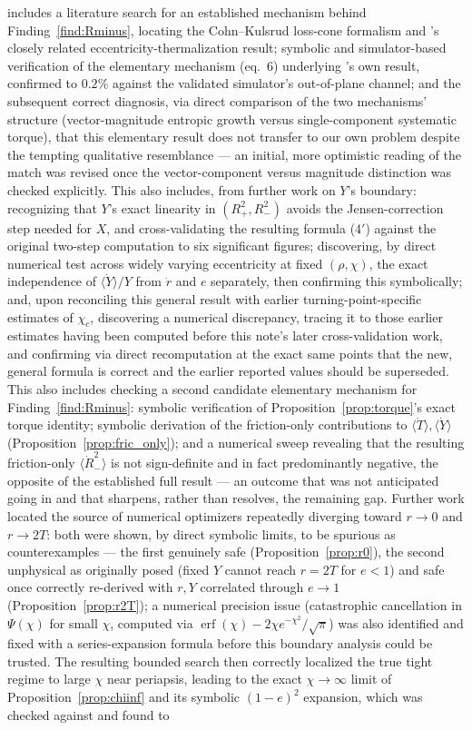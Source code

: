 \documentclass[12pt]{amsart}
\theoremstyle{plain}
\theoremstyle{remark}
\begin{document}
includes a literature search for an established mechanism behind Finding~\ref{find:Rminus}, locating the Cohn--Kulsrud loss-cone formalism and \cite{HamiltonModak2024}'s closely related eccentricity-thermalization result; symbolic and simulator-based verification of the elementary mechanism (eq.~6) underlying \cite{HamiltonModak2024}'s own result, confirmed to $0.2\%$ against the validated simulator's out-of-plane channel; and the subsequent correct diagnosis, via direct comparison of the two mechanisms' structure (vector-magnitude entropic growth versus single-component systematic torque), that this elementary result does not transfer to our own problem despite the tempting qualitative resemblance --- an initial, more optimistic reading of the match was revised once the vector-component versus magnitude distinction was checked explicitly. This also includes, from further work on $Y$'s boundary: recognizing that $Y$'s exact linearity in $(R_+^2,R_-^2)$ avoids the Jensen-correction step needed for $X$, and cross-validating the resulting formula (4$'$) against the original two-step computation to six significant figures; discovering, by direct numerical test across widely varying eccentricity at fixed $(\rho,\chi)$, the exact independence of $\langle\dot Y\rangle/Y$ from $\dot r$ and $e$ separately, then confirming this symbolically; and, upon reconciling this general result with earlier turning-point-specific estimates of $\chi_c$, discovering a numerical discrepancy, tracing it to those earlier estimates having been computed before this note's later cross-validation work, and confirming via direct recomputation at the exact same points that the new, general formula is correct and the earlier reported values should be superseded. This also includes checking a second candidate elementary mechanism for Finding~\ref{find:Rminus}: symbolic verification of Proposition~\ref{prop:torque}'s exact torque identity; symbolic derivation of the friction-only contributions to $\langle\dot T\rangle,\langle\dot Y\rangle$ (Proposition~\ref{prop:fric_only}); and a numerical sweep revealing that the resulting friction-only $\langle\dot R_-^2\rangle$ is not sign-definite and in fact predominantly negative, the opposite of the established full result --- an outcome that was not anticipated going in and that sharpens, rather than resolves, the remaining gap. Further work located the source of numerical optimizers repeatedly diverging toward $r\to0$ and $r\to2T$: both were shown, by direct symbolic limits, to be spurious as counterexamples --- the first genuinely safe (Proposition~\ref{prop:r0}), the second unphysical as originally posed (fixed $Y$ cannot reach $r=2T$ for $e<1$) and safe once correctly re-derived with $r,Y$ correlated through $e\to1$ (Proposition~\ref{prop:r2T}); a numerical precision issue (catastrophic cancellation in $\Psi(\chi)$ for small $\chi$, computed via $\operatorname{erf}(\chi)-2\chi e^{-\chi^2}/\sqrt\pi$) was also identified and fixed with a series-expansion formula before this boundary analysis could be trusted. The resulting bounded search then correctly localized the true tight regime to large $\chi$ near periapsis, leading to the exact $\chi\to\infty$ limit of Proposition~\ref{prop:chiinf} and its symbolic $(1-e)^2$ expansion, which was checked against and found to 
\end{document}

